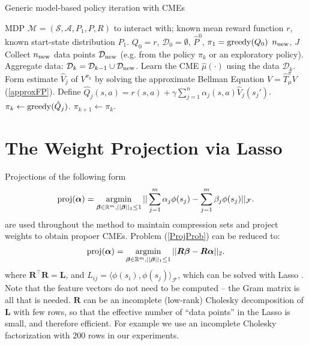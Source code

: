 \documentclass[letterpaper]{article}
\newcommand{\ShaweTaylorBook}{DBLP:books/daglib/0026002}
\newcommand{\TibshiraniLasso}{tibshirani96regression}
\newcommand{\cD}{{\mathcal D}}
\newcommand{\cF}{{\mathcal F}}
\newcommand{\cA}{{\mathcal A}}
\newcommand{\cS}{{\mathcal S}}
\newcommand{\cM}{{\mathcal M}}
\newcommand{\balpha}{{\bm \alpha}}
\newcommand{\bbeta}{{\bm \beta}}
\newcommand{\bL}{{\bm L}}
\newcommand{\bR}{{\bm R}}
\newcommand{\R}{{\mathbb R}}
\newcommand{\argmin}{\operatornamewithlimits{argmin}}
\newcommand{\greedy}{\operatornamewithlimits{greedy}}
\newcommand{\lang}{\langle}
\newcommand{\rang}{\rangle}
\newcommand{\nn}{\nonumber}
\begin{document}
\begin{algorithm}[htb]
   \caption{Generic model-based policy iteration with CMEs}
   \label{GenericPolIt}
\begin{algorithmic}
    MDP $\cM = (\cS,\cA,P_1,P,R)$ to interact with; known mean reward function $r$, known start-state distribution $P_1$.
	  $Q_0=r$, $\cD_0 = \emptyset$, $\hat P^0$, $\pi_1 = \greedy(Q_0)$
    $n_{\rm new}$, $J$\\
	  Collect $n_{\rm new}$ data points $\cD_{\rm new}$ (e.g. from the policy $\pi_k$ or an exploratory policy). Aggregate data: $\cD_k = \cD_{k-1}\cup\cD_{\rm new}$.
	  Learn the CME $\hat \mu(\cdot)$ using the data $\cD_k$.
    Form estimate $\hat V_j$ of $V^{\pi_k}$ by solving the approximate Bellman Equation $V =  \hat T^\pi_{\hat \mu} V$ (\ref{approxFP}). Define $\hat Q_j(s,a) = r(s,a) + \gamma \sum_{j=1}^n \alpha_j(s,a) \hat V_j(s_j')$.
	  $\pi_{k} \leftarrow \greedy(\hat Q_j)$. 
   \ENDFOR
	 \STATE $\pi_{k+1} \leftarrow \pi_{k} $.
	\ENDFOR
\end{algorithmic}
\end{algorithm}

\section{The Weight Projection via Lasso} \label{LassoSec}

Projections of the following form
\begin{align}
{\rm proj}(\balpha) = \argmin_{\bbeta \in \R^m, ||\bbeta||_1\le 1} || \sum_{j=1}^m \alpha_j \phi(s_j) - \sum_{j=1}^m \beta_j  \phi(s_j)  ||_{\cF}. \label{ProjProb}
\end{align}
are used throughout the method to maintain compression sets and project weights to obtain propoer CMEs. Problem (\ref{ProjProb}) can be reduced to:
\begin{align}
{\rm proj}(\balpha)  = \argmin_{\bbeta \in \R^m, ||\bbeta||_1\le 1} || \bR \bbeta - \bR \balpha ||_2. \nn
\end{align}
where $\bR^\top \bR = \bL$, and $L_{ij} = \lang \phi(s_i), \phi(s_j)\rang_\cF$, which can be solved with Lasso \citep{\TibshiraniLasso}. Note that the feature vectors do not need to be computed -- the Gram matrix is all that is needed. $\bR$ can be an incomplete  (low-rank) Cholesky decomposition \cite[see e.g.][]{\ShaweTaylorBook} of $\bL$ with few rows, so that the effective number of ``data points'' in the Lasso is small, and therefore efficient. For example we use an incomplete Cholesky factorization with $200$ rows in our experiments.
\end{document}
